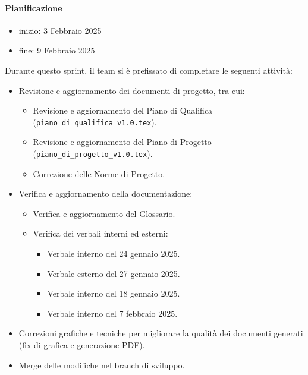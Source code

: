 \documentclass{article}
\begin{document}
                \paragraph{Pianificazione}
                \begin{itemize}
                    \item inizio: 3 Febbraio 2025
                    \item fine: 9 Febbraio 2025
                \end{itemize}
                Durante questo sprint, il team si è prefissato di completare le seguenti attività:
                \begin{itemize}
                    \item Revisione e aggiornamento dei documenti di progetto, tra cui:
                    \begin{itemize}
                        \item Revisione e aggiornamento del Piano di Qualifica (\texttt{piano\_di\_qualifica\_v1.0.tex}).
                        \item Revisione e aggiornamento del Piano di Progetto (\texttt{piano\_di\_progetto\_v1.0.tex}).
                        \item Correzione delle Norme di Progetto.
                    \end{itemize}
                    \item Verifica e aggiornamento della documentazione:
                    \begin{itemize}
                        \item Verifica e aggiornamento del Glossario.
                        \item Verifica dei verbali interni ed esterni:
                        \begin{itemize}
                            \item Verbale interno del 24 gennaio 2025.
                            \item Verbale esterno del 27 gennaio 2025.
                            \item Verbale interno del 18 gennaio 2025.
                            \item Verbale interno del 7 febbraio 2025.
                        \end{itemize}
                    \end{itemize}
                    \item Correzioni grafiche e tecniche per migliorare la qualità dei documenti generati (fix di grafica e generazione PDF).
                    \item Merge delle modifiche nel branch di sviluppo.
                \end{itemize}
\end{document}
